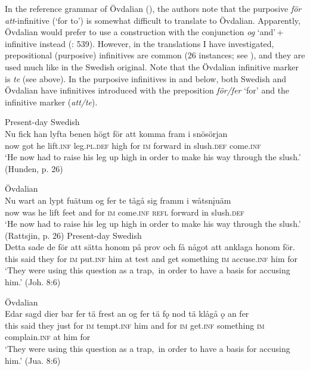 \documentclass[output=paper]{langscibook}
\begin{document}
In the reference grammar of Övdalian (\citealt{AkerbergNystrom2012}), the authors note that the purposive \textit{för att}{}-infinitive (‘for to’) is somewhat difficult to translate to Övdalian. Apparently, Övdalian would prefer to use a construction with the conjunction \textit{og} ‘and’\,+\,infinitive instead (\citealt{AkerbergNystrom2012}: 539). However, in the translations I have investigated, prepositional (purposive) infinitives are common (26 instances; see ), and they are used much like in the Swedish original. Note that the Övdalian infinitive marker is \textit{te} (see  above). In the purposive infinitives in  and  below, both Swedish and Övdalian have infinitives introduced with the preposition \textit{för/fer} ‘for’ and the infinitive marker (\textit{att/te}).


\ea
\label{ex:kalm:15}
\ea Present-day Swedish\\\label{ex:kalm:15a}
\gll Nu fick han lyfta benen högt för att komma fram i snösörjan\\
now got he lift.\textsc{inf} leg.\textsc{pl.def} high for \textsc{im} forward in slush.\textsc{def} come.\textsc{inf}\\ 
\glt ‘He now had to raise his leg up high in order to make his way through the slush.’ (Hunden, p. 26)

\ex Övdalian\\\label{ex:kalm:15b}
\gll Nu wart an lypt fuätum og fer te tågå sig framm i wåtsn\k{i}uäm\\
now was he lift feet and for \textsc{im} come.\textsc{inf} \textsc{refl} forward in slush.\textsc{def}\\
\glt ‘He now had to raise his leg up high in order to make his way through the slush.’ (Rattsjin, p. 26)
\z 
\ex
\label{ex:kalm:16}
\ea Present-day Swedish\\\label{ex:kalm:16a}
\gll Detta sade de för att sätta honom på prov och få något att anklaga honom för.\\
this said they for \textsc{im} put.\textsc{inf} him at test and get something \textsc{im} accuse.\textsc{inf} him for\\
\glt ‘They were using this question as a trap,{~}in order to have a basis for accusing him.’ (Joh. 8:6)

\ex Övdalian\\\label{ex:kalm:16b}
\gll Edar sagd dier bar fer tä frest an og fer tä fǫ nod tä klågå ǫ an fer\\
this said they just for \textsc{im} tempt.\textsc{inf} him and for \textsc{im} get.\textsc{inf} something \textsc{im} complain.\textsc{inf} at him for\\
\glt ‘They were using this question as a trap,{~}in order to have a basis for accusing him.’ (Jua. 8:6)
\z 
\z 
\end{document}
